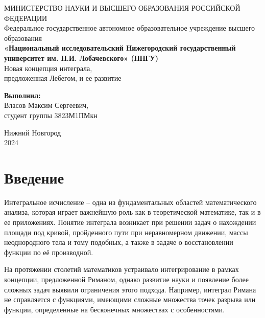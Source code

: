 \documentclass[a4paper,14pt]{extarticle}
\begin{document}
\begin{titlepage}
\begin{center}
МИНИСТЕРСТВО НАУКИ И ВЫСШЕГО ОБРАЗОВАНИЯ РОССИЙСКОЙ ФЕДЕРАЦИИ\\
Федеральное государственное автономное образовательное учреждение высшего образования\\
\textbf{«Национальный исследовательский Нижегородский государственный университет им. Н.И. Лобачевского» (ННГУ)}\\
\vspace*{\fill}
{\LARGE Новая концепция интеграла,\\предложенная Лебегом, и ее развитие}\\
\vspace{2cm}
\end{center}
\hfill
\begin{minipage}{0.4\textwidth}
\raggedright
\textbf{Выполнил:}\\
Власов Максим Сергеевич,\\
студент группы 3823М1ПМкн\\
\end{minipage}
\vspace*{\fill}
\begin{center}
Нижний Новгород\\
2024
\end{center}
\end{titlepage}

\newpage
\setcounter{page}{2}
\tableofcontents

\newpage
\section*{Введение}

Интегральное исчисление -- одна из фундаментальных областей математического анализа, которая играет важнейшую роль как в теоретической математике, так и в ее приложениях. Понятие интеграла возникает при решении задач о нахождении площади под кривой, пройденного пути при неравномерном движении, массы неоднородного тела и тому подобных, а также в задаче о восстановлении функции по её производной. 

На протяжении столетий математиков устраивало интегрирование в рамках концепции, предложенной Риманом, однако развитие науки и появление более сложных задач выявили ограничения этого подхода. Например, интеграл Римана не справляется с функциями, имеющими сложные множества точек разрыва или функции, определенные на бесконечных множествах с особенностями.
\end{document}
